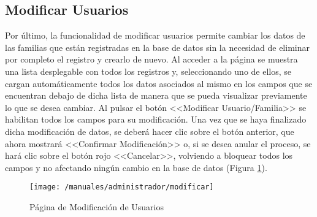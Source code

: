 \clearpage

\subsection*{Modificar Usuarios}
Por último, la funcionalidad de modificar usuarios permite cambiar los datos de las familias que están registradas en la base de datos sin la necesidad de eliminar por completo el registro y crearlo de nuevo. Al acceder a la página se muestra una lista desplegable con todos los registros y, seleccionando uno de ellos, se cargan automáticamente todos los datos asociados al mismo en los campos que se encuentran debajo de dicha lista de manera que se pueda visualizar previamente lo que se desea cambiar. Al pulsar el botón <<Modificar Usuario/Familia>> se habilitan todos los campos para su modificación. Una vez que se haya finalizado dicha modificación de datos, se deberá hacer clic sobre el botón anterior, que ahora mostrará <<Confirmar Modificación>> o, si se desea anular el proceso, se hará clic sobre el botón rojo <<Cancelar>>, volviendo a bloquear todos los campos y no afectando ningún cambio en la base de datos (Figura \ref{fig:modificarweb}).

\begin{figure}[!h]
	\begin{center}
		\texttt{[image: /manuales/administrador/modificar]}
		\caption{Página de Modificación de Usuarios}
		\label{fig:modificarweb}
	\end{center}
\end{figure}